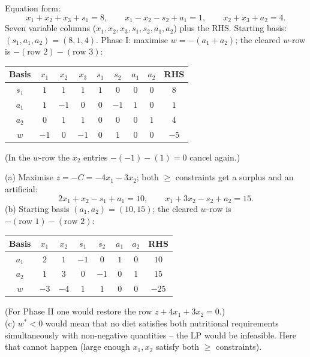 \begin{solutions}
  \item Equation form:
        \[
          x_{1}+x_{2}+x_{3}+s_{1}=8,\qquad
          x_{1}-x_{2}-s_{2}+a_{1}=1,\qquad
          x_{2}+x_{3}+a_{2}=4 .
        \]
        Seven variable columns ($x_{1},x_{2},x_{3},s_{1},s_{2},a_{1},a_{2}$)
        plus the RHS. Starting basis: $(s_{1},a_{1},a_{2})=(8,1,4)$.
        Phase I: maximise $w=-(a_{1}+a_{2})$; the cleared $w$-row is
        $-(\text{row 2})-(\text{row 3})$:
        \begin{center}
        \begin{tabular}{c|ccccccc|c}
        Basis & $x_{1}$ & $x_{2}$ & $x_{3}$ & $s_{1}$ & $s_{2}$
              & $a_{1}$ & $a_{2}$ & RHS\\
        \hline
        $s_{1}$ & $1$ & $1$ & $1$ & $1$ & $0$ & $0$ & $0$ & $8$\\
        $a_{1}$ & $1$ & $-1$ & $0$ & $0$ & $-1$ & $1$ & $0$ & $1$\\
        $a_{2}$ & $0$ & $1$ & $1$ & $0$ & $0$ & $0$ & $1$ & $4$\\
        \hline
        $w$ & $-1$ & $0$ & $-1$ & $0$ & $1$ & $0$ & $0$ & $-5$\\
        \end{tabular}
        \end{center}
        (In the $w$-row the $x_{2}$ entries $-(-1)-(1)=0$ cancel again.)

  \item (a) Maximise $z=-C=-4x_{1}-3x_{2}$; both $\ge$ constraints get a
        surplus and an artificial:
        \[
          2x_{1}+x_{2}-s_{1}+a_{1}=10,\qquad
          x_{1}+3x_{2}-s_{2}+a_{2}=15 .
        \]
        (b) Starting basis $(a_{1},a_{2})=(10,15)$; the cleared $w$-row is
        $-(\text{row 1})-(\text{row 2})$:
        \begin{center}
        \begin{tabular}{c|cccccc|c}
        Basis & $x_{1}$ & $x_{2}$ & $s_{1}$ & $s_{2}$ & $a_{1}$ & $a_{2}$
              & RHS\\
        \hline
        $a_{1}$ & $2$ & $1$ & $-1$ & $0$ & $1$ & $0$ & $10$\\
        $a_{2}$ & $1$ & $3$ & $0$ & $-1$ & $0$ & $1$ & $15$\\
        \hline
        $w$ & $-3$ & $-4$ & $1$ & $1$ & $0$ & $0$ & $-25$\\
        \end{tabular}
        \end{center}
        (For Phase II one would restore the row $z+4x_{1}+3x_{2}=0$.)\\
        (c) $w^{*}<0$ would mean that no diet satisfies both nutritional
        requirements simultaneously with non-negative quantities -- the LP
        would be infeasible. Here that cannot happen (large enough
        $x_{1},x_{2}$ satisfy both $\ge$ constraints).


\end{solutions}
